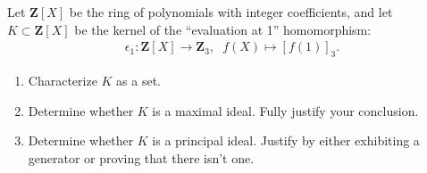 \documentclass[11pt,twoside,openany]{memoir}
\begin{document}
    \begin{exercise}
    Let $\mathbf{Z}[X]$ be the ring of polynomials with integer coefficients, and let $K\subset \mathbf{Z}[X]$ be the kernel of the ``evaluation at 1'' homomorphism:
        \begin{equation*}
        \begin{split}
            \epsilon_1:\mathbf{Z}[X] \rightarrow \mathbf{Z}_3, \hspace{7pt} f(X) \mapsto [f(1)]_3.
        \end{split}
        \end{equation*}
        \begin{enumerate}[label = (\arabic*),itemsep=1pt,topsep=3pt]
            \item Characterize $K$ as a set.
            \item Determine whether $K$ is a maximal ideal. Fully justify your conclusion.
            \item Determine whether $K$ is a principal ideal. Justify by either exhibiting a generator or proving that there isn't one.
        \end{enumerate}
    \end{exercise}
\end{document}
